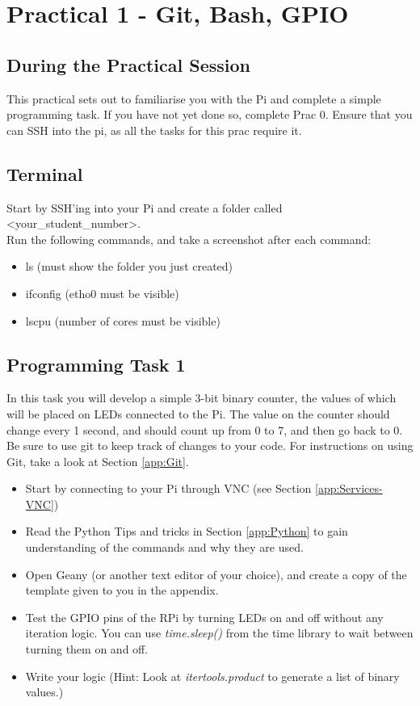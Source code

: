 \section{Practical 1 - Git, Bash, GPIO}

\subsection{During the Practical Session}
This practical sets out to familiarise you with the Pi and complete a simple programming task. If you have not yet done so, complete Prac 0. Ensure that you can SSH into the pi, as all the tasks for this prac require it.


\subsection{Terminal}
\label{sec:Prac1:Terminal}
Start by SSH'ing into your Pi and create a folder called \textless your\_student\_number\textgreater.\\
Run the following commands, and take a screenshot after each command:
\begin{itemize}
    \item ls (must show the folder you just created)
    \item ifconfig (etho0 must be visible)
    \item lscpu (number of cores must be visible)
\end{itemize}

\subsection{Programming Task 1}
In this task you will develop a simple 3-bit binary counter, the values of which will be placed on LEDs connected to the Pi. The value on the counter should change every 1 second, and should count up from 0 to 7, and then go back to 0.
Be sure to use git to keep track of changes to your code. For instructions on using Git, take a look at Section \ref{app:Git}.
\begin{itemize}
    \item Start by connecting to your Pi through VNC (see Section \ref{app:Services-VNC})
    \item Read the Python Tips and tricks in Section \ref{app:Python} to gain understanding of the commands and why they are used.
    \item Open Geany (or another text editor of your choice), and create a copy of the template given to you in the appendix.
    \item Test the GPIO pins of the RPi by turning LEDs on and off without any iteration logic. You can use \textit{time.sleep()} from the time library to wait between turning them on and off.
    \item Write your logic (Hint: Look at \textit{itertools.product} to generate a list of binary values.)
\end{itemize}

